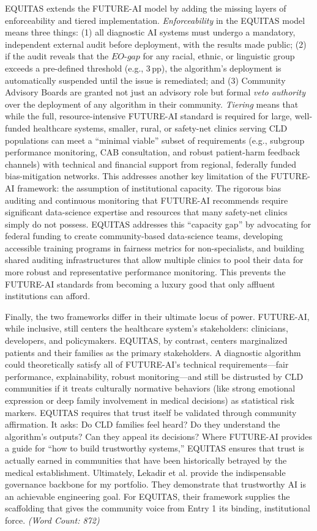 \documentclass[11pt,twoside]{article}
\DeclareRobustCommand{\EOgap}{EO\text{-}gap\xspace}
\DeclareRobustCommand{\pp}{pp\xspace} %
\begin{document}
\textsc{EQUITAS} extends the FUTURE-AI model by adding the missing layers of enforceability and tiered implementation. \textit{Enforceability} in the \textsc{EQUITAS} model means three things: (1) all diagnostic AI systems must undergo a mandatory, independent external audit before deployment, with the results made public; (2) if the audit reveals that the $\EOgap$ for any racial, ethnic, or linguistic group exceeds a pre-defined threshold (e.g., 3\,\pp), the algorithm’s deployment is automatically suspended until the issue is remediated; and (3) Community Advisory Boards are granted not just an advisory role but formal \textit{veto authority} over the deployment of any algorithm in their community. \textit{Tiering} means that while the full, resource-intensive FUTURE-AI standard is required for large, well-funded healthcare systems, smaller, rural, or safety-net clinics serving CLD populations can meet a “minimal viable” subset of requirements (e.g., subgroup performance monitoring, CAB consultation, and robust patient-harm feedback channels) with technical and financial support from regional, federally funded bias-mitigation networks. This addresses another key limitation of the FUTURE-AI framework: the assumption of institutional capacity. The rigorous bias auditing and continuous monitoring that FUTURE-AI recommends require significant data-science expertise and resources that many safety-net clinics simply do not possess. \textsc{EQUITAS} addresses this “capacity gap” by advocating for federal funding to create community-based data-science teams, developing accessible training programs in fairness metrics for non-specialists, and building shared auditing infrastructures that allow multiple clinics to pool their data for more robust and representative performance monitoring. This prevents the FUTURE-AI standards from becoming a luxury good that only affluent institutions can afford.

Finally, the two frameworks differ in their ultimate locus of power. FUTURE-AI, while inclusive, still centers the healthcare system’s stakeholders: clinicians, developers, and policymakers. \textsc{EQUITAS}, by contrast, centers marginalized patients and their families as the primary stakeholders. A diagnostic algorithm could theoretically satisfy all of FUTURE-AI’s technical requirements—fair performance, explainability, robust monitoring—and still be distrusted by CLD communities if it treats culturally normative behaviors (like strong emotional expression or deep family involvement in medical decisions) as statistical risk markers. \textsc{EQUITAS} requires that trust itself be validated through community affirmation. It asks: Do CLD families feel heard? Do they understand the algorithm’s outputs? Can they appeal its decisions? Where FUTURE-AI provides a guide for “how to build trustworthy systems,” \textsc{EQUITAS} ensures that trust is actually earned in communities that have been historically betrayed by the medical establishment. Ultimately, Lekadir et al. provide the indispensable governance backbone for my portfolio. They demonstrate that trustworthy AI is an achievable engineering goal. For \textsc{EQUITAS}, their framework supplies the scaffolding that gives the community voice from Entry 1 its binding, institutional force. \textit{(Word Count: 872)}
\end{document}
